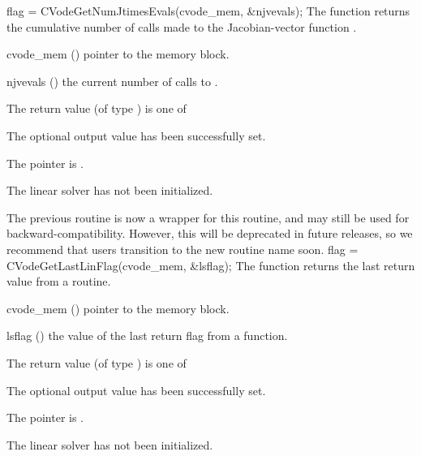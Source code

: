 {
  flag = CVodeGetNumJtimesEvals(cvode\_mem, \&njvevals);
}
{
  The function  returns the
  cumulative number of calls made to the Jacobian-vector function
  .
}
{
  \begin{args}
  \item[cvode\_mem] ()
    pointer to the {\cvodes} memory block.
  \item[njvevals] ()
    the current number of calls to .
  \end{args}
}
{
  The return value  (of type ) is one of
  \begin{args}
  \item[\Id{CVLS\_SUCCESS}]
    The optional output value has been successfully set.
  \item[\Id{CVLS\_MEM\_NULL}]
    The  pointer is .
  \item[\Id{CVLS\_LMEM\_NULL}]
    The {\cvls} linear solver has not been initialized.
  \end{args}
}
{
  The previous routine  is now a wrapper for
  this routine, and may still be used for backward-compatibility.
  However, this will be deprecated in future releases, so we recommend
  that users transition to the new routine name soon.
}
{
  flag = CVodeGetLastLinFlag(cvode\_mem, \&lsflag);
}
{
  The function  returns the
  last return value from a {\cvls} routine.
}
{
  \begin{args}
  \item[cvode\_mem] ()
    pointer to the {\cvodes} memory block.
  \item[lsflag] ()
    the value of the last return flag from a {\cvls} function.
  \end{args}
}
{
  The return value  (of type ) is one of
  \begin{args}
  \item[\Id{CVLS\_SUCCESS}]
    The optional output value has been successfully set.
  \item[\Id{CVLS\_MEM\_NULL}]
    The  pointer is .
  \item[\Id{CVLS\_LMEM\_NULL}]
    The {\cvls} linear solver has not been initialized.
  \end{args}
}
